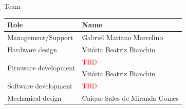 
\begin{frame}{Team}

\begin{table}[!htb]
    \centering
    \label{tab:team}
    \begin{tabular}{ll}
        \toprule[1.5pt]
        \textbf{Role} & \textbf{Name} \\
        \midrule
        Management/Support                    & Gabriel Mariano Marcelino \\
        Hardware design                       & Vitória Beatriz Bianchin \\
        \multirow{2}{*}{Firmware development} & \textcolor{red}{TBD} \\
                                              & Vitória Beatriz Bianchin \\
        Software development                  & \textcolor{red}{TBD} \\
        Mechanical design                     & Caique Sales de Miranda Gomes \\
        \bottomrule[1.5pt]
    \end{tabular}
\end{table}

\end{frame}



